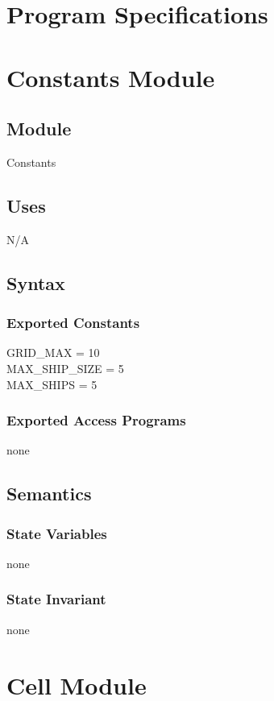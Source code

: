 \documentclass[12pt]{article}
\newcommand{\newConstantsModule}[6]{
	\subsection* {Module}
		#1
	\subsection* {Uses}
		#2
	\subsection* {Syntax}
		\subsubsection* {Exported Constants}
			#3
		\subsubsection* {Exported Access Programs}
			#4
	\subsection* {Semantics}
		\subsubsection* {State Variables}
			#5
		\subsubsection* {State Invariant}
			#6
}
\begin{document}
\section{Program Specifications}

\section* {Constants Module}

\label{Constants}

\newConstantsModule{Constants}
	{%
		N/A
	}
	{%
		GRID\_MAX = 10 \\
		MAX\_SHIP\_SIZE = 5 \\
		MAX\_SHIPS = 5
	}
	{%
		none
	}
	{%
		none
	}
	{%
		none
	}

\newpage

\section* {Cell Module}

\label{Cell}
\end{document}
